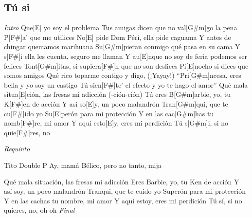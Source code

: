\subsection{T\'u si}
\noindent

\vspace{1cm}

\begin{guitar}
	\begin{multicols}{2}
		
		\textit{Intro}
		Que[E] yo soy el problema
		Tus amigas dicen que no val[G#m]go la pena
		P[F#]a' que me utilices
		No[E] pide Dom Péri, ella pide caguama
	Y antes de chingar quemamos marihuana
	Su[G#m]pieran conmigo qué pasa en su cama
	Y s[F#]i ella les cuenta, seguro me llaman
	Y au[E]nque no soy de feria podemos ser felices
	Tont[G#m]itas, si supiera[F#]n que no son deslices
	Pi[E]nocho si dices que somos amigos
	Qué rico toparme contigo y digo, (¡Yayay!)
	``Pri[G#m]ncesa, eres bella y yo soy un castigo
	Tú sien[F#]te' el efecto y yo te hago el amor''
	Qué mala situa[E]ción, las fresas mi adicción (-ción-ción)
	Tú eres B[G#m]arbie, yo, tu K[F#]en de acción
	Y así so[E]y, un poco malandrón
	Tran[G#m]qui, que te cu[F#]ido yo
	Su[E]perón para mi protección
	Y en las cac[G#m]has tu nomb[F#]re, mi amor
	Y aquí esto[E]y, eres mi perdición
	Tú s[G#m]i, si no quie[F#]res, no
	\par
	\textit{Requinto}
	\par
	Tito Double P
	Ay, mamá
	Bélico, pero no tanto, mija
	\par
	Qué mala situación, las fresas mi adicción
	Eres Barbie, yo, tu Ken de acción
	Y así soy, un poco malandrón
	Tranqui, que te cuido yo
	Superón para mi protección
	Y en las cachas tu nombre, mi amor
	Y aquí estoy, eres mi perdición
	Tú sí, si no quieres, no, oh-oh
		\textit{Final}
	\end{multicols}
\end{guitar}
